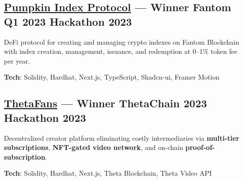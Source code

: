 \documentclass[letter,10pt]{article}
\begin{document}
\subsection{{\href{https://github.com/JustUzair/Pumpkin-Protocol}{Pumpkin Index Protocol} --- Winner Fantom Q1 2023 Hackathon \hfill 2023}}
\begin{zitemize}
  \item DeFi protocol for creating and managing crypto indexes on Fantom Blockchain with index creation, management, issuance, and redemption at 0--1\% token fee per year.
  \item \textbf{Tech}: Solidity, Hardhat, Next.js, TypeScript, Shadcn-ui, Framer Motion
\end{zitemize}

\subsection{{\href{https://github.com/JustUzair/ThetaFans}{ThetaFans} --- Winner ThetaChain 2023 Hackathon \hfill 2023}}
\begin{zitemize}
  \item Decentralized creator platform eliminating costly intermediaries via \textbf{multi-tier subscriptions}, \textbf{NFT-gated video network}, and on-chain \textbf{proof-of-subscription}.
  \item \textbf{Tech}: Solidity, Hardhat, Next.js, Theta Blockchain, Theta Video API
\end{zitemize}
\end{document}
